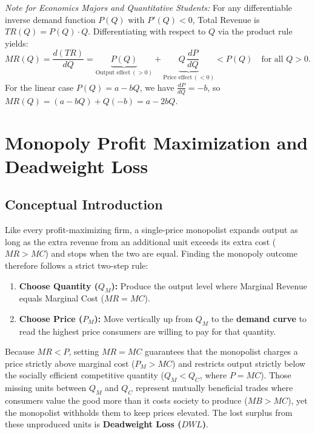 \documentclass[11pt,letterpaper]{article}
\begin{document}
\begin{tcolorbox}[colback=CourseBlue!6!white,colframe=CourseBlue,title=\textbf{Optional Advanced Calculus: Deriving the Output and Price Effects}]
\small
\emph{Note for Economics Majors and Quantitative Students:}
For any differentiable inverse demand function $P(Q)$ with $P'(Q) < 0$, Total Revenue is $TR(Q) = P(Q)\cdot Q$. Differentiating with respect to $Q$ via the product rule yields:
\[
MR(Q) = \frac{d(TR)}{dQ} = \underbrace{P(Q)}_{\text{Output effect}\,(>0)} + \underbrace{Q\,\frac{dP}{dQ}}_{\text{Price effect}\,(<0)} < P(Q) \quad \text{for all } Q > 0.
\]
For the linear case $P(Q) = a - bQ$, we have $\frac{dP}{dQ} = -b$, so $MR(Q) = (a - bQ) + Q(-b) = a - 2bQ$.
\end{tcolorbox}

\section{Monopoly Profit Maximization and Deadweight Loss}

\subsection*{Conceptual Introduction}
Like every profit-maximizing firm, a single-price monopolist expands output as long as the extra revenue from an additional unit exceeds its extra cost ($MR > MC$) and stops when the two are equal. Finding the monopoly outcome therefore follows a strict two-step rule:
\begin{enumerate}
    \item \textbf{Choose Quantity ($Q_M$):} Produce the output level where Marginal Revenue equals Marginal Cost ($MR = MC$).
    \item \textbf{Choose Price ($P_M$):} Move vertically up from $Q_M$ to the \textbf{demand curve} to read the highest price consumers are willing to pay for that quantity.
\end{enumerate}
Because $MR < P$, setting $MR = MC$ guarantees that the monopolist charges a price strictly above marginal cost ($P_M > MC$) and restricts output strictly below the socially efficient competitive quantity ($Q_M < Q_C$, where $P = MC$). Those missing units between $Q_M$ and $Q_C$ represent mutually beneficial trades where consumers value the good more than it costs society to produce ($MB > MC$), yet the monopolist withholds them to keep prices elevated. The lost surplus from these unproduced units is \textbf{Deadweight Loss ($DWL$)}.
\end{document}
